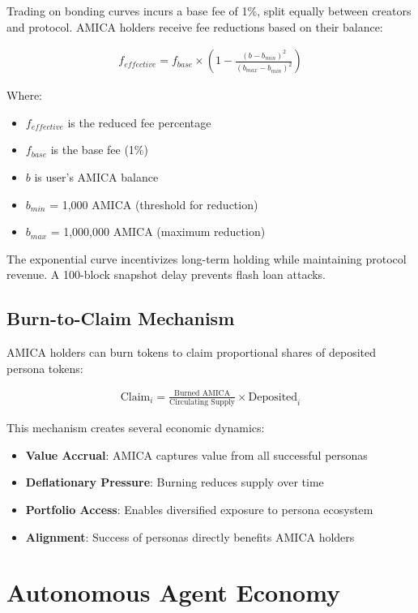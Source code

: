 \documentclass{article}
\begin{document}
Trading on bonding curves incurs a base fee of 1\%, split equally between creators and protocol. AMICA holders receive fee reductions based on their balance:

\begin{align}
f_{effective} = f_{base} \times \left(1 - \frac{(b - b_{min})^2}{(b_{max} - b_{min})^2}\right)
\end{align}

Where:
\begin{itemize}
    \item $f_{effective}$ is the reduced fee percentage
    \item $f_{base}$ is the base fee (1\%)
    \item $b$ is user's AMICA balance
    \item $b_{min}$ = 1,000 AMICA (threshold for reduction)
    \item $b_{max}$ = 1,000,000 AMICA (maximum reduction)
\end{itemize}

The exponential curve incentivizes long-term holding while maintaining protocol revenue. A 100-block snapshot delay prevents flash loan attacks.

\subsection{Burn-to-Claim Mechanism}

AMICA holders can burn tokens to claim proportional shares of deposited persona tokens:

\begin{align}
\text{Claim}_i = \frac{\text{Burned AMICA}}{\text{Circulating Supply}} \times \text{Deposited}_i
\end{align}

This mechanism creates several economic dynamics:

\begin{itemize}
    \item \textbf{Value Accrual}: AMICA captures value from all successful personas
    \item \textbf{Deflationary Pressure}: Burning reduces supply over time
    \item \textbf{Portfolio Access}: Enables diversified exposure to persona ecosystem
    \item \textbf{Alignment}: Success of personas directly benefits AMICA holders
\end{itemize}

\section{Autonomous Agent Economy}
\end{document}

